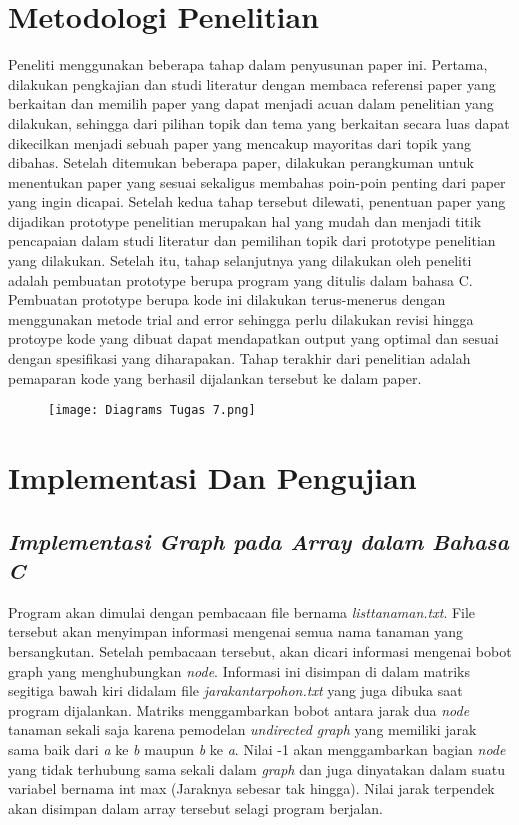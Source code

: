 \documentclass[conference]{IEEEtran}
\begin{document}
\section{Metodologi Penelitian}
Peneliti menggunakan beberapa tahap dalam penyusunan
paper ini. Pertama, dilakukan pengkajian dan studi literatur
dengan membaca referensi paper yang berkaitan dan memilih
paper yang dapat menjadi acuan dalam penelitian yang dilakukan, sehingga dari pilihan topik dan tema yang berkaitan
secara luas dapat dikecilkan menjadi sebuah paper yang mencakup mayoritas dari topik yang dibahas. Setelah ditemukan
beberapa paper, dilakukan perangkuman untuk menentukan
paper yang sesuai sekaligus membahas poin-poin penting
dari paper yang ingin dicapai. Setelah kedua tahap tersebut
dilewati, penentuan paper yang dijadikan prototype penelitian
merupakan hal yang mudah dan menjadi titik pencapaian
dalam studi literatur dan pemilihan topik dari prototype penelitian yang dilakukan.
Setelah itu, tahap selanjutnya yang dilakukan oleh peneliti
adalah pembuatan prototype berupa program yang ditulis
dalam bahasa C. Pembuatan prototype berupa kode ini dilakukan terus-menerus dengan menggunakan metode trial and
error sehingga perlu dilakukan revisi hingga protoype kode
yang dibuat dapat mendapatkan output yang optimal dan
sesuai dengan spesifikasi yang diharapakan. Tahap terakhir
dari penelitian adalah pemaparan kode yang berhasil dijalankan tersebut ke dalam paper.

\begin{figure}[htbp]
	\centerline{\texttt{[image: Diagrams Tugas 7.png]}}
\end{figure}

\section{Implementasi Dan Pengujian}

\subsection{\textit{Implementasi Graph pada Array dalam Bahasa C}}
Program akan dimulai dengan pembacaan file bernama
 \textit{listtanaman.txt}. File tersebut akan menyimpan informasi mengenai semua nama tanaman yang bersangkutan. Setelah pembacaan tersebut, akan dicari informasi mengenai bobot graph
yang menghubungkan \textit{node}. Informasi ini disimpan di dalam
matriks segitiga bawah kiri didalam file  \textit{jarakantarpohon.txt}
yang juga dibuka saat program dijalankan. Matriks menggambarkan bobot antara jarak dua  \textit{node} tanaman sekali saja karena
pemodelan  \textit{undirected graph} yang memiliki jarak sama baik
dari \textit{a} ke \textit{b} maupun \textit{b} ke \textit{a}. Nilai -1 akan menggambarkan
bagian  \textit{node} yang tidak terhubung sama sekali dalam  \textit{graph}
dan juga dinyatakan dalam suatu variabel bernama int max
(Jaraknya sebesar tak hingga). Nilai jarak terpendek akan
disimpan dalam array tersebut selagi program berjalan.
\end{document}
